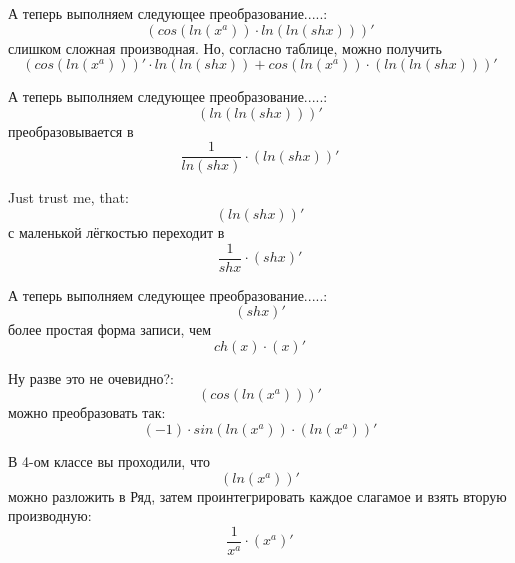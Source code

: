 \documentclass[a4paper, 12pt]{article}
\begin{document}
А теперь выполняем следующее преобразование.....:
\begin{equation}
\left(cos\left(ln\left(x^{a}\right)\right) \cdot ln\left(ln\left(shx\right)\right) \right)'
\end{equation}
слишком сложная производная. Но, согласно таблице, можно получить
\begin{equation}
\left(cos\left(ln\left(x^{a}\right)\right) \right)' \cdot ln\left(ln\left(shx\right)\right) + cos\left(ln\left(x^{a}\right)\right)\cdot \left( ln\left(ln\left(shx\right)\right) \right)'
\end{equation}

А теперь выполняем следующее преобразование.....:
\begin{equation}
\left(ln\left(ln\left(shx\right)\right) \right)'
\end{equation}
преобразовывается в
\begin{equation}
\frac{1}{ln\left(shx\right)} \cdot \left(ln\left(shx\right) \right)'
\end{equation}

Just trust me, that:
\begin{equation}
\left(ln\left(shx\right) \right)'
\end{equation}
с маленькой лёгкостью переходит в
\begin{equation}
\frac{1}{shx} \cdot \left(shx \right)'
\end{equation}

А теперь выполняем следующее преобразование.....:
\begin{equation}
\left(shx \right)'
\end{equation}
более простая форма записи, чем
\begin{equation}
ch \left( x \right) \cdot \left( x \right)'
\end{equation}

Ну разве это не очевидно?:
\begin{equation}
\left(cos\left(ln\left(x^{a}\right)\right) \right)'
\end{equation}
можно преобразовать так:
\begin{equation}
(-1) \cdot sin \left( ln\left(x^{a}\right) \right) \cdot \left( ln\left(x^{a}\right) \right)'
\end{equation}

В 4-ом классе вы проходили, что
\begin{equation}
\left(ln\left(x^{a}\right) \right)'
\end{equation}
можно разложить в Ряд, затем проинтегрировать каждое слагамое и взять вторую производную:
\begin{equation}
\frac{1}{x^{a}} \cdot \left(x^{a} \right)'
\end{equation}
\end{document}
